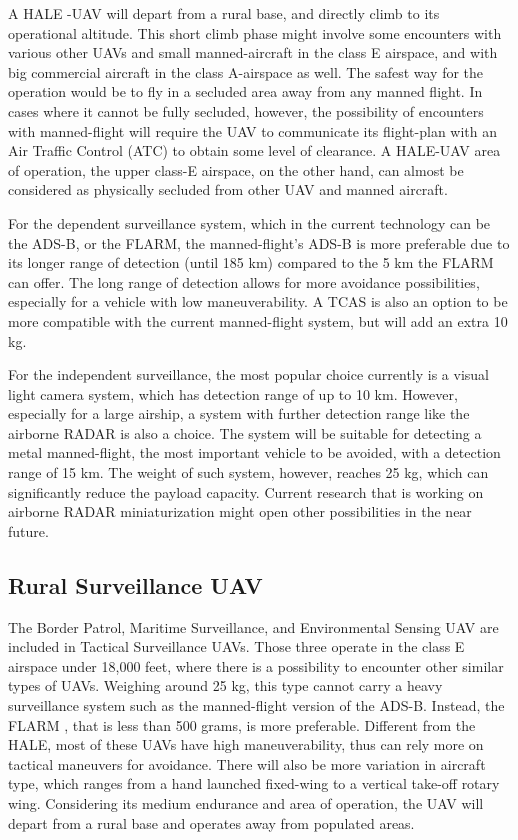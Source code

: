 A HALE -UAV will depart from a rural base, and directly climb to its operational altitude. This short climb phase might involve some encounters with various other UAVs and small manned-aircraft in the class E airspace, and with big commercial aircraft in the class A-airspace as well. The safest way for the operation would be to fly in a secluded area away from any manned flight. In cases where it cannot be fully secluded, however, the possibility of encounters with manned-flight will require the UAV to communicate its flight-plan with an Air Traffic Control (ATC) to obtain some level of clearance. A HALE-UAV area of operation, the upper class-E airspace, on the other hand, can almost be considered as physically secluded from other UAV and manned aircraft. 

For the dependent surveillance system, which in the current technology can be the ADS-B\cite{McCallie:11}, or the FLARM, the manned-flight's ADS-B is more preferable due to its longer range of detection (until 185 km) compared to the 5 km the FLARM can offer. The long range of detection allows for more avoidance possibilities, especially for a vehicle with low maneuverability. A TCAS is also an option to be more compatible with the current manned-flight system, but will add an extra 10 kg.

For the independent surveillance, the most popular choice currently is a visual light camera system, which has detection range of up to 10 km. However, especially for a large airship, a system with further detection range like the airborne RADAR is also a choice. The system will be suitable for detecting a metal manned-flight, the most important vehicle to be avoided, with a detection range of 15 km. The weight of such system, however, reaches 25 kg, which can significantly reduce the payload capacity. Current research that is working on airborne RADAR miniaturization\cite{Moses:14}  might open other possibilities in the near future. 

\subsection{Rural Surveillance UAV}
The Border Patrol\cite{Girard:04}, Maritime Surveillance\cite{Meester:13}, and Environmental Sensing UAV \cite{Casbeer:05} are included in Tactical Surveillance UAVs. Those three operate in the class E airspace under 18,000 feet, where there is a possibility to encounter other similar types of UAVs. Weighing around 25 kg, this type cannot carry a heavy surveillance system such as the manned-flight version of the ADS-B\cite{McCallie:11}. Instead, the FLARM , that is less than 500 grams, is more preferable. Different from the HALE, most of these UAVs have high maneuverability, thus can rely more on tactical maneuvers for avoidance. There will also be more variation in aircraft type, which ranges from a hand launched fixed-wing to a vertical take-off rotary wing. Considering its medium endurance and area of operation, the UAV will depart from a rural base and operates away from populated areas.

